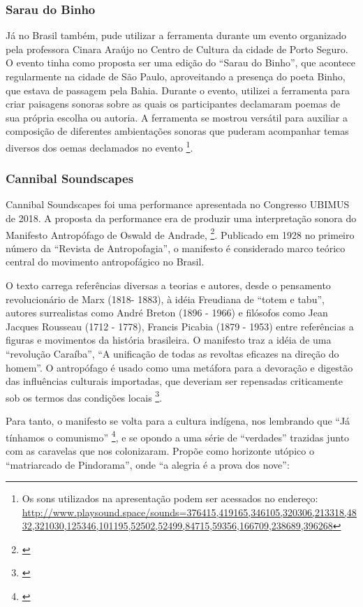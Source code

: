\subsubsection{Sarau do Binho}

Já no Brasil também, pude utilizar a ferramenta durante um evento organizado pela professora Cinara Araújo no Centro de Cultura da cidade de Porto Seguro. O evento tinha como proposta ser uma edição do ``Sarau do Binho'', que acontece regularmente na cidade de São Paulo, aproveitando a presença do poeta Binho, que estava de passagem pela Bahia. Durante o evento, utilizei a ferramenta para criar paisagens sonoras sobre as quais os participantes declamaram poemas de sua própria escolha ou autoria. A ferramenta se mostrou versátil para auxiliar a composição de diferentes ambientações sonoras que puderam acompanhar temas diversos dos oemas declamados no evento \footnote{Os sons utilizados na apresentação podem ser acessados no endereço: \url{http://www.playsound.space/sounds=376415,419165,346105,320306,213318,4832,321030,125346,101195,52502,52499,84715,59356,166709,238689,396268}}.


\subsubsection{Cannibal Soundscapes}
Cannibal Soundscapes foi uma performance apresentada no Congresso UBIMUS de 2018. A proposta da performance era de produzir uma interpretação sonora do Manifesto Antropófago de Oswald de Andrade, \footnote{\cite{Andrade1928}}. Publicado em 1928 no primeiro número da ``Revista de Antropofagia'', o manifesto é considerado  marco teórico central do movimento antropofágico no Brasil.

O texto carrega referências diversas a teorias e autores, desde o pensamento revolucionário de Marx (1818- 1883), à idéia Freudiana de ``totem e tabu'', autores surrealistas como André Breton (1896 - 1966) e filósofos como Jean Jacques Rousseau (1712 - 1778), Francis Picabia (1879 - 1953) entre referências a figuras e movimentos da história brasileira. O manifesto traz a idéia de uma ``revolução Caraíba'', ``A unificação de todas as revoltas eficazes na direção do homem''. O antropófago é usado como uma metáfora para a devoração e digestão das influências culturais importadas, que deveriam ser repensadas criticamente sob os termos das condições locais \footnote{\cite{Berg-1999}}.

Para tanto, o manifesto se volta para a cultura indígena, nos lembrando que ``Já tínhamos o comunismo'' \footnote{\cite{Bradley2007}}, e se opondo a uma série de ``verdades'' trazidas junto com as caravelas que nos colonizaram. Propõe como horizonte utópico o ``matriarcado de Pindorama'', onde ``a alegria é a prova dos nove'':

